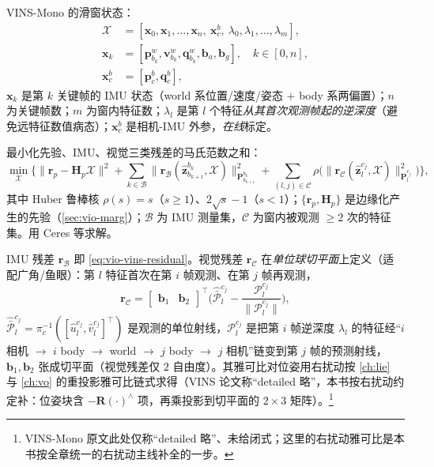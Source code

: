 \begin{definition}[滑窗全状态向量]\label{def:vio-state}
VINS-Mono 的滑窗状态\cite{qin2018vins}：
\begin{equation}
\begin{aligned}
  \mathcal{X}&=[\mathbf{x}_0,\mathbf{x}_1,\dots,\mathbf{x}_n,\ \mathbf{x}^b_c,\ \lambda_0,\lambda_1,\dots,\lambda_m],\\
  \mathbf{x}_k&=[\mathbf{p}^w_{b_k},\mathbf{v}^w_{b_k},\mathbf{q}^w_{b_k},\mathbf{b}_a,\mathbf{b}_g],\quad k\in[0,n],\\
  \mathbf{x}^b_c&=[\mathbf{p}^b_c,\mathbf{q}^b_c],
\end{aligned}
  \label{eq:vio-vins-state}
\end{equation}
$\mathbf{x}_k$ 是第 $k$ 关键帧的 IMU 状态（world 系位置/速度/姿态 $+$ body 系两偏置）；$n$ 为关键帧数；$m$ 为窗内特征数；$\lambda_l$ 是第 $l$ 个特征\emph{从其首次观测帧起的逆深度}（避免远特征数值病态）；$\mathbf{x}^b_c$ 是相机-IMU 外参，\emph{在线}标定。
\end{definition}

\begin{theorem}\label{thm:vio-ba}
最小化先验、IMU、视觉三类残差的马氏范数之和\cite{qin2018vins}：
\begin{equation}
  \min_{\mathcal{X}}\Big\{\|\mathbf{r}_p-\mathbf{H}_p\mathcal{X}\|^2
  +\sum_{k\in\mathcal{B}}\|\mathbf{r}_{\mathcal{B}}(\hat{\mathbf{z}}^{b_k}_{b_{k+1}},\mathcal{X})\|^2_{\mathbf{P}^{b_k}_{b_{k+1}}}
  +\sum_{(l,j)\in\mathcal{C}}\rho\big(\|\mathbf{r}_{\mathcal{C}}(\hat{\mathbf{z}}^{c_j}_l,\mathcal{X})\|^2_{\mathbf{P}^{c_j}_l}\big)\Big\},
  \label{eq:vio-ba}
\end{equation}
其中 Huber 鲁棒核 $\rho(s)=s$（$s\ge1$）、$2\sqrt{s}-1$（$s<1$）；$\{\mathbf{r}_p,\mathbf{H}_p\}$ 是边缘化产生的先验（\cref{sec:vio-marg}）；$\mathcal{B}$ 为 IMU 测量集，$\mathcal{C}$ 为窗内被观测 $\ge2$ 次的特征集。用 Ceres 等求解。
\end{theorem}

IMU 残差 $\mathbf{r}_{\mathcal{B}}$ 即 \cref{eq:vio-vins-residual}。视觉残差 $\mathbf{r}_{\mathcal{C}}$ 在\emph{单位球切平面}上定义（适配广角/鱼眼）：第 $l$ 特征首次在第 $i$ 帧观测、在第 $j$ 帧再观测，
\begin{equation}
  \mathbf{r}_{\mathcal{C}}=\begin{bmatrix}\mathbf{b}_1&\mathbf{b}_2\end{bmatrix}^\top\Big(\hat{\bar{\mathcal{P}}}^{c_j}_l-\frac{\mathcal{P}^{c_j}_l}{\|\mathcal{P}^{c_j}_l\|}\Big),
  \label{eq:vio-vis-residual}
\end{equation}
$\hat{\bar{\mathcal{P}}}^{c_j}_l=\pi_c^{-1}([\hat u^{c_j}_l,\hat v^{c_j}_l]^\top)$ 是观测的单位射线，$\mathcal{P}^{c_j}_l$ 是把第 $i$ 帧逆深度 $\lambda_l$ 的特征经“$i$ 相机 $\to$ $i$ body $\to$ world $\to$ $j$ body $\to$ $j$ 相机”链变到第 $j$ 帧的预测射线，$\mathbf{b}_1,\mathbf{b}_2$ 张成切平面（视觉残差仅 $2$ 自由度）。其雅可比对位姿用右扰动按 \cref{ch:lie} 与 \cref{ch:vo} 的重投影雅可比链式求得（VINS 论文称“detailed 略”，本书按右扰动约定补：位姿块含 $-\mathbf{R}(\cdot)^\wedge$ 项，再乘投影到切平面的 $2\times3$ 矩阵）。\footnote{VINS-Mono 原文此处仅称“detailed 略”、未给闭式；这里的右扰动雅可比是本书按全章统一的右扰动主线补全的一步。}

